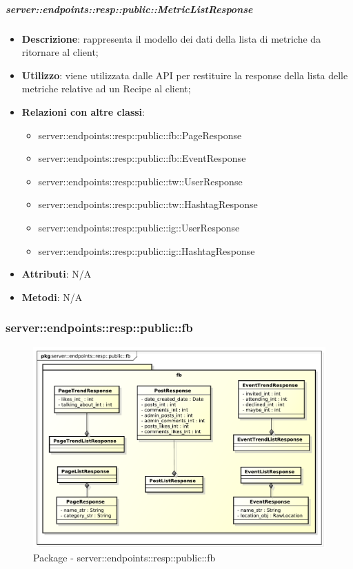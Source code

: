     \subparagraph{server::endpoints::resp::public::MetricListResponse} %
    \label{subp:bdsm_app_server_endpoints_resp_public_metriclistresponse}
    \begin{itemize}
      \item \textbf{Descrizione}: rappresenta il modello dei dati della lista di metriche da ritornare al client;
      \item \textbf{Utilizzo}: viene utilizzata dalle API per restituire la response della lista delle metriche relative ad un Recipe al client;
      \item \textbf{Relazioni con altre classi}:
        \begin{itemize}
          \item server::endpoints::resp::public::fb::PageResponse
          \item server::endpoints::resp::public::fb::EventResponse
          \item server::endpoints::resp::public::tw::UserResponse
          \item server::endpoints::resp::public::tw::HashtagResponse
          \item server::endpoints::resp::public::ig::UserResponse
          \item server::endpoints::resp::public::ig::HashtagResponse
        \end{itemize}
		\item \textbf{Attributi}: N/A
		\item \textbf{Metodi}: N/A
      \end{itemize}

\subsubsection{server::endpoints::resp::public::fb} %
\label{ssub:bdsm_app_server_endpoints_resp_public_fb}
\begin{figure}[!htbp]
	\centering
	\centerline{\includegraphics[scale=0.55]{./images/server/resp_fb.pdf}}
	\caption{Package - server::endpoints::resp::public::fb}
\end{figure}

